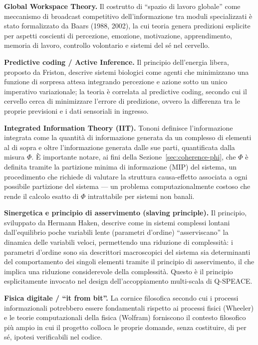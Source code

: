 \documentclass[11pt,a4paper]{article}
\begin{document}
\textbf{Global Workspace Theory.} Il costrutto di ``spazio di lavoro globale'' come meccanismo di broadcast competitivo dell'informazione tra moduli specializzati \`e stato formalizzato da Baars (1988, 2002), la cui teoria genera predizioni esplicite per aspetti coscienti di percezione, emozione, motivazione, apprendimento, memoria di lavoro, controllo volontario e sistemi del s\'e nel cervello.

\textbf{Predictive coding / Active Inference.} Il principio dell'energia libera, proposto da Friston, descrive sistemi biologici come agenti che minimizzano una funzione di sorpresa attesa integrando percezione e azione sotto un unico imperativo variazionale; la teoria \`e correlata al predictive coding, secondo cui il cervello cerca di minimizzare l'errore di predizione, ovvero la differenza tra le proprie previsioni e i dati sensoriali in ingresso.

\textbf{Integrated Information Theory (IIT).} Tononi definisce l'informazione integrata come la quantit\`a di informazione generata da un complesso di elementi al di sopra e oltre l'informazione generata dalle sue parti, quantificata dalla misura $\Phi$. \`E importante notare, ai fini della Sezione~\ref{sec:coherence-phi}, che $\Phi$ \`e definita tramite la partizione minima di informazione (MIP) del sistema, un procedimento che richiede di valutare la struttura causa-effetto associata a ogni possibile partizione del sistema --- un problema computazionalmente costoso che rende il calcolo esatto di $\Phi$ intrattabile per sistemi non banali.

\textbf{Sinergetica e principio di asservimento (slaving principle).} Il principio, sviluppato da Hermann Haken, descrive come in sistemi complessi lontani dall'equilibrio poche variabili lente (parametri d'ordine) ``asserviscano'' la dinamica delle variabili veloci, permettendo una riduzione di complessit\`a: i parametri d'ordine sono sia descrittori macroscopici del sistema sia determinanti del comportamento dei singoli elementi tramite il principio di asservimento, il che implica una riduzione considerevole della complessit\`a. Questo \`e il principio esplicitamente invocato nel design dell'accoppiamento multi-scala di Q-SPEACE.

\textbf{Fisica digitale / ``it from bit''.} La cornice filosofica secondo cui i processi informazionali potrebbero essere fondamentali rispetto ai processi fisici (Wheeler) e le teorie computazionali della fisica (Wolfram) forniscono il contesto filosofico pi\`u ampio in cui il progetto colloca le proprie domande, senza costituire, di per s\'e, ipotesi verificabili nel codice.
\end{document}
